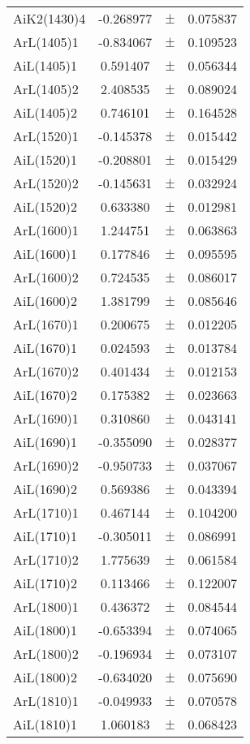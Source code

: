 \begin{table}
\begin{tiny}
\begin{tabular}{lccc}
AiK2(1430)4 & -0.268977 & $\pm$ & 0.075837 \\
ArL(1405)1 & -0.834067 & $\pm$ & 0.109523 \\
AiL(1405)1 & 0.591407 & $\pm$ & 0.056344 \\
ArL(1405)2 & 2.408535 & $\pm$ & 0.089024 \\
AiL(1405)2 & 0.746101 & $\pm$ & 0.164528 \\
ArL(1520)1 & -0.145378 & $\pm$ & 0.015442 \\
AiL(1520)1 & -0.208801 & $\pm$ & 0.015429 \\
ArL(1520)2 & -0.145631 & $\pm$ & 0.032924 \\
AiL(1520)2 & 0.633380 & $\pm$ & 0.012981 \\
ArL(1600)1 & 1.244751 & $\pm$ & 0.063863 \\
AiL(1600)1 & 0.177846 & $\pm$ & 0.095595 \\
ArL(1600)2 & 0.724535 & $\pm$ & 0.086017 \\
AiL(1600)2 & 1.381799 & $\pm$ & 0.085646 \\
ArL(1670)1 & 0.200675 & $\pm$ & 0.012205 \\
AiL(1670)1 & 0.024593 & $\pm$ & 0.013784 \\
ArL(1670)2 & 0.401434 & $\pm$ & 0.012153 \\
AiL(1670)2 & 0.175382 & $\pm$ & 0.023663 \\
ArL(1690)1 & 0.310860 & $\pm$ & 0.043141 \\
AiL(1690)1 & -0.355090 & $\pm$ & 0.028377 \\
ArL(1690)2 & -0.950733 & $\pm$ & 0.037067 \\
AiL(1690)2 & 0.569386 & $\pm$ & 0.043394 \\
ArL(1710)1 & 0.467144 & $\pm$ & 0.104200 \\
AiL(1710)1 & -0.305011 & $\pm$ & 0.086991 \\
ArL(1710)2 & 1.775639 & $\pm$ & 0.061584 \\
AiL(1710)2 & 0.113466 & $\pm$ & 0.122007 \\
ArL(1800)1 & 0.436372 & $\pm$ & 0.084544 \\
AiL(1800)1 & -0.653394 & $\pm$ & 0.074065 \\
ArL(1800)2 & -0.196934 & $\pm$ & 0.073107 \\
AiL(1800)2 & -0.634020 & $\pm$ & 0.075690 \\
ArL(1810)1 & -0.049933 & $\pm$ & 0.070578 \\
AiL(1810)1 & 1.060183 & $\pm$ & 0.068423 \\

\end{tabular}
\end{tiny}
\end{table}
